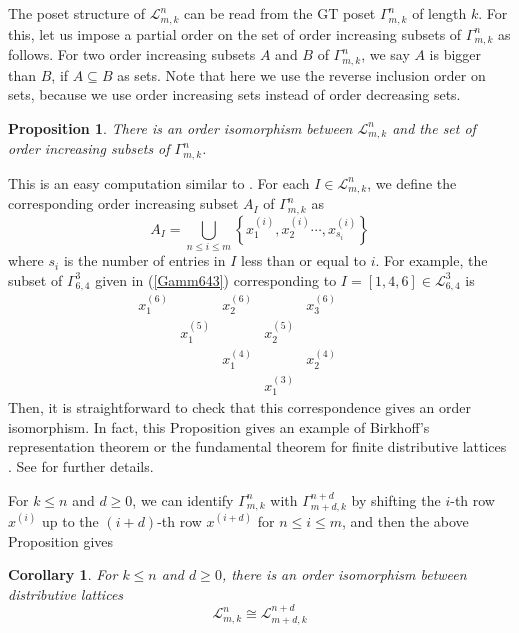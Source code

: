 \documentclass[11pt]{amsart}
\numberwithin{equation}{subsection}
\newtheorem{corollary}[theorem]{Corollary}
\newtheorem{proposition}[theorem]{Proposition}
\begin{document}
\subsection{}
The poset structure of $\mathcal{L}_{m,k}^{n}$ can be read from the GT poset 
$\Gamma _{m,k}^{n}$ of length $k$. For this, let us impose a partial order
on the set of order increasing subsets of $\Gamma _{m,k}^{n}$ as follows.
For two order increasing subsets $A$ and $B$ of $\Gamma _{m,k}^{n}$, we say 
$A$ is bigger than $B$, if $A\subseteq B$ as sets. Note that here we use the
reverse inclusion order on sets, because we use order increasing sets instead of 
order decreasing sets.

\begin{proposition}\label{joinirred2}
There is an order isomorphism between $\mathcal{L}_{m,k}^{n}$ and 
the set of order increasing subsets of $\Gamma _{m,k}^{n}$.
\end{proposition}

This is an easy computation similar to \cite[Theorem 3.8]{Ki08}. For each 
$I\in \mathcal{L}_{m,k}^{n}$, we define the corresponding order increasing
subset $A_{I}$ of $\Gamma _{m,k}^{n}$ as
\begin{equation}
A_I = \bigcup_{n \leq i \leq m} \left\{ x_{1}^{(i)},x_{2}^{(i)}\cdots ,x_{s_{i}}^{(i)}\right\}
\label{order increasing}
\end{equation}
where $s_{i}$ is the number of entries in $I$ less than
or equal to $i$. For example, the subset of $\Gamma_{6,4}^3$ given in (\ref{Gamm643})
corresponding to $I=[1,4,6] \in \mathcal{L}_{6,4}^3$ is
\begin{equation*}
\begin{array}{ccccccccc}
x_{1}^{(6)} &  & x_{2}^{(6)} &  & x_{3}^{(6)} &  &  &  &  \\ 
& x_{1}^{(5)} &  & x_{2}^{(5)} &  &  &  &  &  \\ 
&  & x_{1}^{(4)} &  & x_{2}^{(4)} &  &  &  & \\ 
&  &  & x_{1}^{(3)} &  &  &  & & 
\end{array}\end{equation*}
Then, it is straightforward to check that this correspondence
gives an order isomorphism. In fact, this Proposition gives an example of Birkhoff's
representation theorem or the fundamental theorem for finite distributive
lattices \cite[Theorem 3.4.1]{Sta97}. See \cite[\S 3.3]{Ki08} for further
details.

\smallskip

For $k \leq n$ and $d \geq 0$, we can identify $\Gamma_{m,k}^n$ with $\Gamma_{m+d,k}^{n+d}$
by shifting the $i$-th row $x^{(i)}$ up to the $(i+d)$-th row $x^{(i+d)}$ for
$n \leq i \leq m$, and then the above Proposition gives
\begin{corollary}\label{L-conversion}
For $k \leq n$ and $d \geq 0$, there is an order isomorphism between distributive 
lattices $$ \mathcal{L}_{m, k}^n \cong  \mathcal{L}_{m+d, k}^{n+d}$$
\end{corollary}
\end{document}
